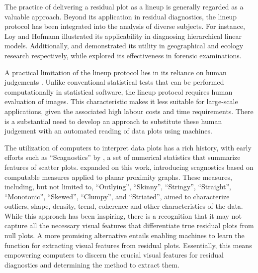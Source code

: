 \documentclass[]{interact}
\theoremstyle{plain}%
\theoremstyle{definition}
\theoremstyle{remark}
\begin{document}
The practice of delivering a residual plot as a lineup is generally
regarded as a valuable approach. Beyond its application in residual
diagnostics, the lineup protocol has been integrated into the analysis
of diverse subjects. For instance, Loy and Hofmann
\citetext{\citeyear{loy2013diagnostic}; \citeyear{loy2014hlmdiag}; \citeyear{loy2015you}}
illustrated its applicability in diagnosing hierarchical linear models.
Additionally, \citet{widen2016graphical} and \citet{fieberg2024using}
demonstrated its utility in geographical and ecology research
respectively, while \citet{krishnan2021hierarchical} explored its
effectiveness in forensic examinations.

A practical limitation of the lineup protocol lies in its reliance on
human judgements \citep[see][ about the practical
limitations]{li2024plot}. Unlike conventional statistical tests that can
be performed computationally in statistical software, the lineup
protocol requires human evaluation of images. This characteristic makes
it less suitable for large-scale applications, given the associated high
labour costs and time requirements. There is a substantial need to
develop an approach to substitute these human judgement with an
automated reading of data plots using machines.

The utilization of computers to interpret data plots has a rich history,
with early efforts such as ``Scagnostics'' by \citet{tukey1985computer},
a set of numerical statistics that summarize features of scatter plots.
\citet{wilkinson2005graph} expanded on this work, introducing
scagnostics based on computable measures applied to planar proximity
graphs. These measures, including, but not limited to, ``Outlying'',
``Skinny'', ``Stringy'', ``Straight'', ``Monotonic'', ``Skewed'',
``Clumpy'', and ``Striated'', aimed to characterize outliers, shape,
density, trend, coherence and other characteristics of the data. While
this approach has been inspiring, there is a recognition
\citep{buja2009statistical} that it may not capture all the necessary
visual features that differentiate true residual plots from null plots.
A more promising alternative entails enabling machines to learn the
function for extracting visual features from residual plots.
Essentially, this means empowering computers to discern the crucial
visual features for residual diagnostics and determining the method to
extract them.
\end{document}
